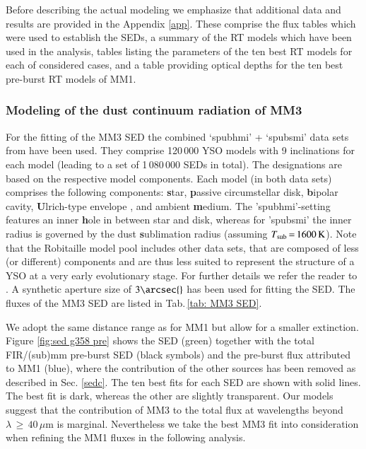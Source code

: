 Before describing the actual modeling we emphasize that
additional data and results are provided in the Appendix \ref{app}. These comprise the flux tables which were used to establish the SEDs, a summary of the RT models which have been used in the analysis, tables listing the parameters of the ten best RT models for each of considered cases, and a table providing optical depths for the ten best pre-burst RT models of MM1.




\subsubsection{Modeling of the dust continuum radiation of MM3}\label{drt3}
 
For the fitting of the MM3 SED the combined `spubhmi' + `spubsmi' data sets from \citet{2017A&A...600A..11R} have been used. They comprise 120\,000 YSO models with 9 inclinations for each model 
(leading to a set of 1\,080\,000 SEDs in total).
The designations are based on the respective model components.
Each model (in both data sets) comprises the following components: {\bf s}tar, 
{\bf p}assive circumstellar disk,
{\bf b}ipolar cavity, {\bf U}lrich-type envelope \citep{1976ApJ...210..377U}, and ambient {\bf m}edium. %
The 'spubhmi'-setting features an inner {\bf h}ole in between star and disk, whereas for 'spubsmi' the inner radius is governed by the dust {\bf s}ublimation radius (assuming $T_{\rm sub}\,{=}\,1600\,{\rm K}$). Note that the Robitaille model pool includes other data sets, that are composed of less (or different) components and are thus less suited to represent the structure of a YSO at a very early evolutionary stage. For further details we refer the reader to \citet{2017A&A...600A..11R}. 
A synthetic aperture size of $3\arcsec{}$ has been used for fitting the SED. The fluxes of the MM3 SED are listed in Tab.\,\ref{tab: MM3 SED}. 

We adopt the same distance range as for MM1 but allow for a smaller extinction.
Figure \ref{fig:sed g358 pre} shows the SED (green) together with the total FIR/(sub)mm pre-burst SED (black symbols) and the pre-burst flux attributed to MM1 (blue), where the contribution of the other sources has been removed as described in Sec. \ref{sedc}. The ten best fits for each SED are shown with solid lines. The best fit is dark, whereas the other are slightly transparent.
Our models suggest that the contribution of MM3 to the total flux at wavelengths beyond $\lambda\,{\ge}\,40\,\mu$m is marginal. Nevertheless we take the best MM3 fit into consideration when refining the MM1 fluxes in the following analysis. 

